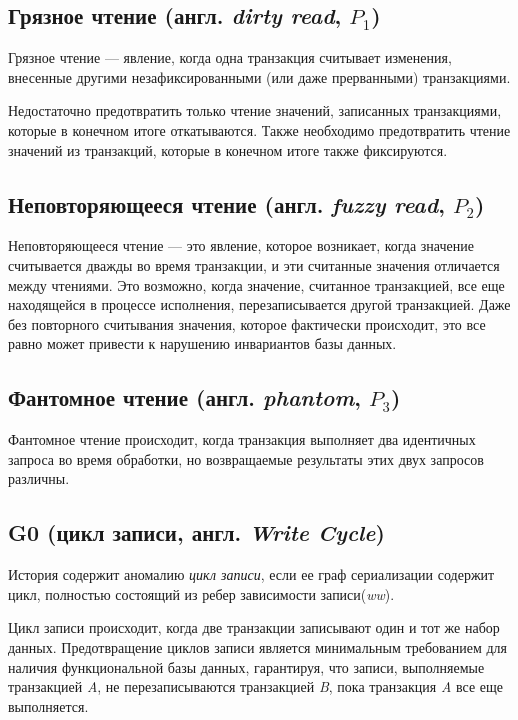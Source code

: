 \documentclass[12pt,  openany]{book}
\begin{document}
\subsection{Грязное чтение (англ. \textit{dirty read}, $P_1$)}
Грязное чтение --- явление, когда одна транзакция считывает изменения, внесенные другими незафиксированными (или даже прерванными) транзакциями. \cite{sookocheff}
\par Недостаточно предотвратить только чтение значений, записанных транзакциями, которые в конечном итоге откатываются. Также необходимо предотвратить чтение значений из транзакций, которые в конечном итоге также фиксируются.  \cite{CritiqueANSI_SQL}

\subsection{Неповторяющееся чтение (англ. \textit{fuzzy read}, $P_2$)}
Неповторяющееся чтение --- это явление, которое возникает, когда значение считывается дважды во время транзакции, и эти считанные значения отличается между чтениями.  Это возможно, когда значение, считанное транзакцией, все еще находящейся в процессе исполнения, перезаписывается другой транзакцией. Даже без повторного считывания значения, которое фактически происходит, это все равно может привести к нарушению инвариантов базы данных.  \cite{CritiqueANSI_SQL}

\subsection{Фантомное чтение (англ. \textit{phantom}, $P_3$)}
Фантомное чтение происходит, когда транзакция выполняет два идентичных запроса во время обработки, но возвращаемые результаты этих двух запросов различны.  \cite{sookocheff}

\subsection{G0 (цикл записи, англ. \textit{Write Cycle})}
История содержит аномалию \textit{цикл записи}, если ее граф сериализации содержит цикл, полностью состоящий из ребер зависимости записи(\textit{ww}). 
\par Цикл записи происходит, когда две транзакции записывают один и тот же набор данных. Предотвращение циклов записи является минимальным требованием для наличия функциональной базы данных, гарантируя, что записи, выполняемые транзакцией \textit{A}, не перезаписываются транзакцией \textit{B}, пока транзакция \textit{A} все еще выполняется.  \cite{sookocheff}
\end{document}
